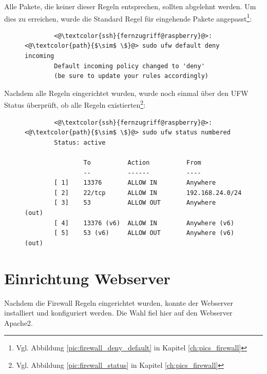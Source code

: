 \documentclass[a4paper, 11pt]{scrartcl}
\begin{document}
Alle Pakete, die keiner dieser Regeln entsprechen, sollten abgelehnt werden. Um dies zu erreichen, wurde die Standard Regel für eingehende Pakete
angepasst\footnote{Vgl. Abbildung \ref{pic:firewall_deny_default} in Kapitel \ref{ch:pics_firewall}}:
\begin{figure}[H]
    \begin{mdframed}[backgroundcolor=bbg]
        \begin{lstlisting}
        <@\textcolor{ssh}{fernzugriff@raspberry}@>:<@\textcolor{path}{$\sim$ \$}@> sudo ufw default deny incoming
        Default incoming policy changed to 'deny'
        (be sure to update your rules accordingly)
        \end{lstlisting}
    \end{mdframed}
    \label{lst:firewall_default_deny}
\end{figure}
Nachdem alle Regeln eingerichtet wurden, wurde noch einmal über den UFW Status überprüft, ob alle Regeln existierten\footnote{Vgl. Abbildung \ref{pic:firewall_status} in Kapitel \ref{ch:pics_firewall}}:
\begin{figure}[H]
    \begin{mdframed}[backgroundcolor=bbg]
        \begin{lstlisting}
        <@\textcolor{ssh}{fernzugriff@raspberry}@>:<@\textcolor{path}{$\sim$ \$}@> sudo ufw status numbered
        Status: active

                To          Action          From
                --          ------          ----
        [ 1]    13376       ALLOW IN        Anywhere
        [ 2]    22/tcp      ALLOW IN        192.168.24.0/24
        [ 3]    53          ALLOW OUT       Anywhere            (out)
        [ 4]    13376 (v6)  ALLOW IN        Anywhere (v6)
        [ 5]    53 (v6)     ALLOW OUT       Anywhere (v6)       (out)
        \end{lstlisting}
    \end{mdframed}
    \label{lst:firewall_all_rules}
\end{figure}



\section{Einrichtung Webserver}
Nachdem die Firewall Regeln eingerichtet wurden, konnte der Webserver installiert und konfiguriert werden. Die Wahl fiel hier auf den Webserver Apache2.
\end{document}
